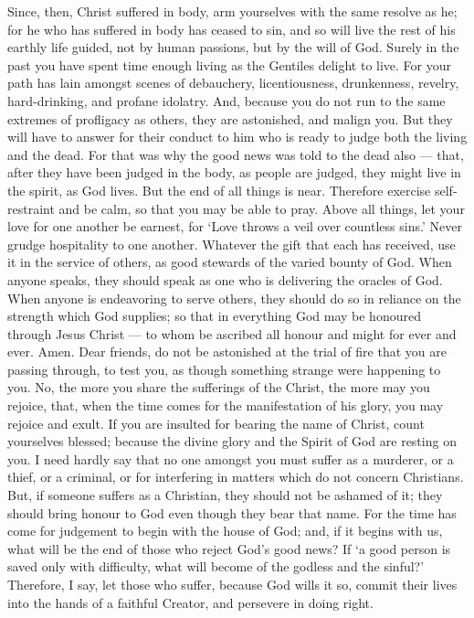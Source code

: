  Since, then, Christ suffered in body, arm yourselves with
the same resolve as he; for he who has suffered in body has ceased to
sin,  and so will live the rest of his earthly life guided,
not by human passions, but by the will of God.  Surely in
the past you have spent time enough living as the Gentiles delight to
live. For your path has lain amongst scenes of debauchery,
licentiousness, drunkenness, revelry, hard-drinking, and profane
idolatry.  And, because you do not run to the same extremes
of profligacy as others, they are astonished, and malign you.
 But they will have to answer for their conduct to him who
is ready to judge both the living and the dead.  For that
was why the good news was told to the dead also --- that, after they
have been judged in the body, as people are judged, they might live in
the spirit, as God lives.  But the end of all things is
near. Therefore exercise self-restraint and be calm, so that you may be
able to pray.  Above all things, let your love for one
another be earnest, for `Love throws a veil over countless sins.'
 Never grudge hospitality to one another. 
Whatever the gift that each has received, use it in the service of
others, as good stewards of the varied bounty of God.  When
anyone speaks, they should speak as one who is delivering the oracles of
God. When anyone is endeavoring to serve others, they should do so in
reliance on the strength which God supplies; so that in everything God
may be honoured through Jesus Christ --- to whom be ascribed all honour
and might for ever and ever. Amen.  Dear friends, do not be
astonished at the trial of fire that you are passing through, to test
you, as though something strange were happening to you. 
No, the more you share the sufferings of the Christ, the more may you
rejoice, that, when the time comes for the manifestation of his glory,
you may rejoice and exult.  If you are insulted for bearing
the name of Christ, count yourselves blessed; because the divine glory
and the Spirit of God are resting on you.  I need hardly
say that no one amongst you must suffer as a murderer, or a thief, or a
criminal, or for interfering in matters which do not concern Christians.
 But, if someone suffers as a Christian, they should not be
ashamed of it; they should bring honour to God even though they bear
that name.  For the time has come for judgement to begin
with the house of God; and, if it begins with us, what will be the end
of those who reject God's good news?  If `a good person is
saved only with difficulty, what will become of the godless and the
sinful?'  Therefore, I say, let those who suffer, because
God wills it so, commit their lives into the hands of a faithful
Creator, and persevere in doing right.

